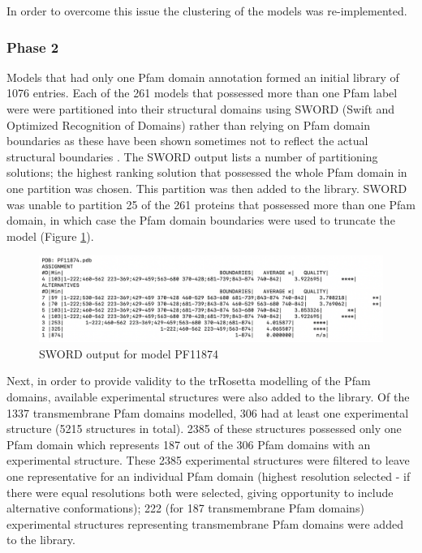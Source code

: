 In order to overcome this issue the clustering of the models was re-implemented.

\subsubsection{Phase 2}
Models that had only one Pfam domain annotation formed an initial library of 1076 entries. Each of the 261 models that possessed more than one Pfam label were were partitioned into their structural domains using SWORD (Swift and Optimized Recognition of Domains) \cite{postic2017ambiguity} rather than relying on Pfam domain boundaries as these have been shown sometimes not to reflect the actual structural boundaries \cite{mesdaghi2020silico}.  The SWORD output lists a number of partitioning solutions; the highest ranking solution that possessed the whole Pfam domain in one partition was chosen.  This partition was then added to the library. SWORD was unable to partition 25 of the 261 proteins that possessed more than one Pfam domain, in which case the Pfam domain boundaries were used to truncate the model (Figure \ref{fig:sword}).

\begin{figure}[th!]
    \centering
    \includegraphics[width=150mm, scale=0.75]{Pfam/sword.png}
    \caption{SWORD output for model PF11874}
    \label{fig:sword}
    \small
\end{figure}

Next, in order to provide validity to the trRosetta modelling of the Pfam domains, available experimental structures were also added to the library. Of the 1337 transmembrane Pfam domains modelled, 306 had at least one experimental structure (5215 structures in total).  2385 of these structures possessed only one Pfam domain which represents 187 out of the 306 Pfam domains with an experimental structure.  These 2385 experimental structures were filtered to leave one representative for an individual Pfam domain (highest resolution selected - if there were equal resolutions both were selected, giving opportunity to include alternative conformations); 222 (for 187 transmembrane Pfam domains) experimental structures representing transmembrane Pfam domains were added to the library.

